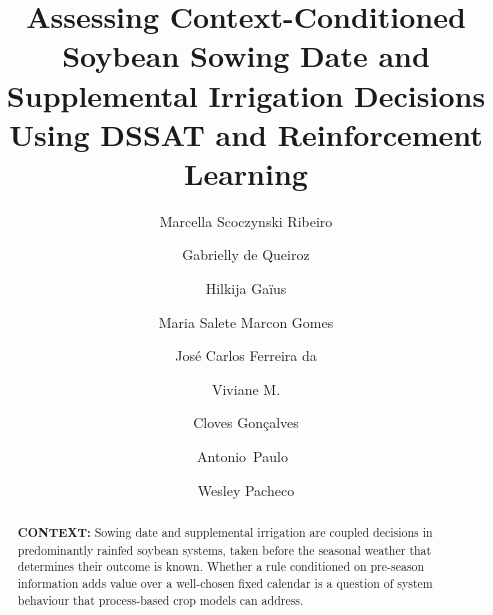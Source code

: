 \documentclass[times,final,authoryear]{elsarticle}
\begin{document}

\begin{frontmatter}

\title{Assessing Context-Conditioned Soybean Sowing Date and Supplemental Irrigation Decisions Using DSSAT and Reinforcement Learning}

\author[2,6,7,8]{Marcella  Scoczynski Ribeiro } %
\author[1]{Gabrielly de Queiroz } %
\author[2]{Hilkija Gaïus } %
\author[1,8]{Maria Salete Marcon Gomes } %
\author[1,8]{José Carlos Ferreira da } %
\author[4,5,6]{Viviane M. } %
\author[4]{Cloves Gonçalves } %
\author[3]{Antonio~Paulo~} %
\author[3,5,6]{Wesley Pacheco } %

\address[1]{State University of Ponta Grossa, Ponta Grossa, Parana/Brazil}
\address[2]{Federal University of Technology - Parana, Brazil}
\address[3]{Institute of Systems and Robotics, Coimbra University, Coimbra/Portugal}
\address[4]{Polytechnic and Arts School, Pontifical Catholic University of Goias, Goiania, Goias/Brazil PC~74.605-010}
\address[5]{Electrical, Mechanical \& Computer Engineering School, Federal University of Goias, Goiania, Goias/Brazil PC~74.605-010}
\address[6]{Experimental \& Technological Research and Study Group, Federal Institute of Goias, Goiania, Goias,  Brazil}
\address[7]{Federal University of Technology - Parana, Graduate Program in Electrical Engineering, Ponta Grossa, Brazil}
\address[8]{State University of Ponta Grossa, Postgraduate Program in Applied Computing, Ponta Grossa, Parana/Brazil}


\begin{abstract}
\textbf{CONTEXT:} Sowing date and supplemental irrigation are coupled decisions in predominantly rainfed soybean systems, taken before the seasonal weather that determines their outcome is known. Whether a rule conditioned on pre-season information adds value over a well-chosen fixed calendar is a question of system behaviour that process-based crop models can address.


\end{abstract}
\end{frontmatter}
\end{document}
